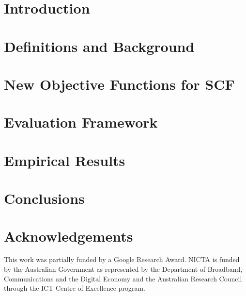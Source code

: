 \documentclass{www2012-accepted}
\begin{document}

\section{Introduction}
\label{sec:Introduction}


\section{Definitions and Background}
\label{sec:Background}


\section{New Objective Functions for SCF}
\label{sec:NewObjFuns}


\section{Evaluation Framework}
\label{sec:Evaluation}


\section{Empirical Results}
\label{sec:EmpResults}


\section{Conclusions}
\label{sec:Conclusions}


\section*{Acknowledgements}

This work was partially funded by a Google Research Award.
NICTA is funded by the Australian Government as represented by
the Department of Broadband, Communications and the Digital
Economy and the Australian Research Council through the ICT
Centre of Excellence program.


%

\end{document}
